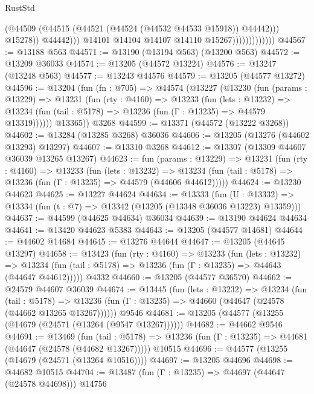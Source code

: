 \begin{lexlean}{RustStd}
\begin{coremodule}
                                        (@44509
                                          (@44515 (@44521 (@44524 (@44532 @44533 @15918)) @44442)))
                                        @15278))
                                    @44442)))
                              @14101
                              @14104
                              @14107
                              @14110
                              @15267)))))))))))))
@44567 := @13188 @563
@44571 := @13190 (@13194 @563) (@13200 @563)
@44572 := @13209 @36033
@44574 := @13205 (@44572 @13224)
@44576 := @13247 (@13248 @563)
@44577 := @13243 @44576
@44579 := @13205 (@44577 @13272)
@44596 := @13204
    (fun (fn : @705) =>
    @44574
      (@13227
        (@13230
          (fun (params : @13229) =>
          @13231
            (fun (rty : @4160) =>
            @13233
              (fun (lets : @13232) =>
              @13234 (fun (tail : @5178) => @13236 (fun (Γ : @13235) => @44579 @13319))))))
        @13365))
    @3268
@44599 := @13371 (@44572 (@13222 @3268))
@44602 := @13284 (@13285 @3268) @36036
@44606 := @13205 (@13276 (@44602 @13293) @13297)
@44607 := @13310 @3268
@44612 := @13307 (@13309 @44607 @36039 @13265 @13267)
@44623 := fun (params : @13229) =>
  @13231
    (fun (rty : @4160) =>
    @13233
      (fun (lets : @13232) =>
      @13234 (fun (tail : @5178) => @13236 (fun (Γ : @13235) => @44579 (@44606 @44612)))))
@44624 := @13230 @44623
@44625 := @13227 @44624
@44634 := @13333
    (fun (U : @13332) => @13334 (fun (t : @7) => @13342 (@13205 (@13348 @36036 @13223) @13359)))
@44637 := @44599 (@44625 @44634) @36034
@44639 := @13190 @44624 @44634
@44641 := @13420 @44623 @5383
@44643 := @13205 (@44577 @14681)
@44644 := @44602 @14684
@44645 := @13276 @44644
@44647 := @13205 (@44645 @13297)
@44658 := @13423
    (fun (rty : @4160) =>
    @13233
      (fun (lets : @13232) =>
      @13234 (fun (tail : @5178) => @13236 (fun (Γ : @13235) => @44643 (@44647 @44612)))))
    @4332
@44660 := @13205 (@44577 @36570)
@44662 := @24579 @44607 @36039
@44674 := @13445
    (fun (lets : @13232) =>
    @13234
      (fun (tail : @5178) =>
      @13236 (fun (Γ : @13235) => @44660 (@44647 (@24578 (@44662 @13265 @13267))))))
    @9546
@44681 := @13205 (@44577 (@13255 (@14679 (@24571 (@13264 (@9547 @13267))))))
@44682 := @44662 @9546
@44691 := @13469
    (fun (tail : @5178) => @13236 (fun (Γ : @13235) => @44681 (@44647 (@24578 (@44682 @13267)))))
    @10515
@44696 := @44577 (@13255 (@14679 (@24571 (@13264 @10516))))
@44697 := @13205 @44696
@44698 := @44682 @10515
@44704 := @13487 (fun (Γ : @13235) => @44697 (@44647 (@24578 @44698))) @14756

\end{coremodule}
\end{lexlean}
